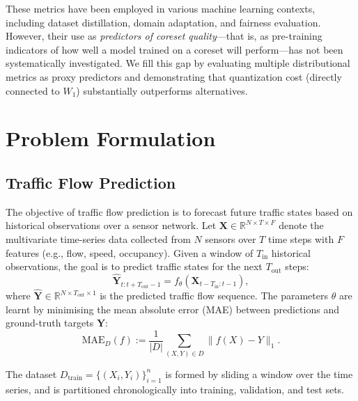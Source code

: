 \documentclass[journal]{IEEEtran}
\newcommand{\MAE}{\mathrm{MAE}}
\newcommand{\Wone}{W_1}
\newcommand{\Dtrain}{D_{\mathrm{train}}}
\begin{document}
These metrics have been employed in various machine learning
contexts, including dataset distillation, domain adaptation, and
fairness evaluation.
However, their use as \emph{predictors of coreset quality}---that
is, as pre-training indicators of how well a model trained on a
coreset will perform---has not been systematically investigated.
We fill this gap by evaluating multiple distributional metrics as
proxy predictors and demonstrating that quantization cost
(directly connected to $\Wone$) substantially outperforms
alternatives.


\section{Problem Formulation}
\label{sec:formulation}

\subsection{Traffic Flow Prediction}

The objective of traffic flow prediction is to forecast future
traffic states based on historical observations over a sensor
network.
Let $\mathbf{X} \in \mathbb{R}^{N \times T \times F}$ denote the
multivariate time-series data collected from $N$ sensors over $T$
time steps with $F$ features (e.g., flow, speed, occupancy).
Given a window of $T_{\mathrm{in}}$ historical observations, the
goal is to predict traffic states for the next
$T_{\mathrm{out}}$ steps:
\begin{equation}\label{eq:forecast}
  \hat{\mathbf{Y}}_{t:t+T_{\mathrm{out}}-1}
  = f_\theta\!\left(
    \mathbf{X}_{t-T_{\mathrm{in}}:t-1}
  \right),
\end{equation}
where $\hat{\mathbf{Y}} \in \mathbb{R}^{N \times T_{\mathrm{out}}
\times 1}$ is the predicted traffic flow sequence.
The parameters $\theta$ are learnt by minimising the mean absolute
error (MAE) between predictions and ground-truth targets
$\mathbf{Y}$:
\begin{equation}\label{eq:mae}
  \MAE_D(f) := \frac{1}{|D|}
  \sum_{(X, Y) \in D} \| f(X) - Y \|_1.
\end{equation}

The dataset $\Dtrain = \{(X_i, Y_i)\}_{i=1}^{n}$ is formed by
sliding a window over the time series, and is partitioned
chronologically into training, validation, and test sets.
\end{document}
